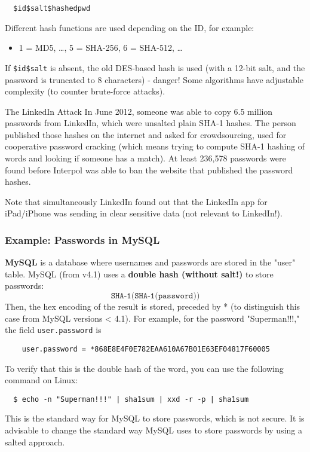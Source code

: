 \begin{verbatim}
  $id$salt$hashedpwd
\end{verbatim}
Different hash functions are used depending on the ID, for example:
\begin{itemize}
  \item 1 = MD5, \ldots, 5 = SHA-256, 6 = SHA-512, \ldots
\end{itemize}
If \texttt{\$id\$salt} is absent, the old DES-based hash is used (with
a 12-bit salt, and the password is truncated to 8 characters) - danger!
Some algorithms have adjustable complexity (to counter brute-force attacks).


\begin{casehistory}{The LinkedIn Attack}
  In June 2012, someone was able to copy 6.5 million passwords from LinkedIn, which were unsalted plain SHA-1
  hashes. The person published those hashes on the internet and asked for crowdsourcing, used for cooperative
  password cracking (which means trying to compute SHA-1 hashing of words and looking if someone has a match).
  At least 236,578 passwords were found before Interpol was able to ban the website that published the
  password hashes.

  Note that simultaneously LinkedIn found out that the LinkedIn app for iPad/iPhone was sending in clear sensitive data
  (not relevant to LinkedIn!).
\end{casehistory}

\subsubsection{Example: Passwords in MySQL}
\textbf{MySQL} is a database where usernames and passwords are stored in the "user" table. MySQL (from v4.1) uses a \textbf{double hash (without salt!)} to store passwords:
\[
  \texttt{SHA-1(SHA-1(password))}
\]
Then, the hex encoding of the result is stored, preceded by * (to distinguish this case from MySQL versions < 4.1). For example, for the password "Superman!!!," the field \texttt{user.password} is
\begin{verbatim}
    user.password = *868E8E4F0E782EAA610A67B01E63EF04817F60005
\end{verbatim}
To verify that this is the double hash of the word, you can use the following command on Linux:
\begin{verbatim}
  $ echo -n "Superman!!!" | sha1sum | xxd -r -p | sha1sum
\end{verbatim}
This is the standard way for MySQL to store passwords, which is not secure. It is advisable to change the standard way MySQL uses to store passwords by using a salted approach.


